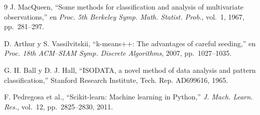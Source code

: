 \documentclass[10pt,twocolumn]{article}
\begin{document}
\begin{thebibliography}{9}
\small
{}
J. MacQueen, ``Some methods for classification and analysis of multivariate
observations,'' en \emph{Proc. 5th Berkeley Symp. Math. Statist. Prob.}, vol.~1,
1967, pp.~281--297.

D. Arthur y S. Vassilvitskii, ``k-means++: The advantages of careful
seeding,'' en \emph{Proc. 18th ACM--SIAM Symp. Discrete Algorithms}, 2007,
pp.~1027--1035.

G. H. Ball y D. J. Hall, ``ISODATA, a novel method of data analysis and
pattern classification,'' Stanford Research Institute, Tech. Rep. AD699616,
1965.

F. Pedregosa et al., ``Scikit-learn: Machine learning in Python,''
\emph{J. Mach. Learn. Res.}, vol.~12, pp.~2825--2830, 2011.
\end{thebibliography}
\end{document}
